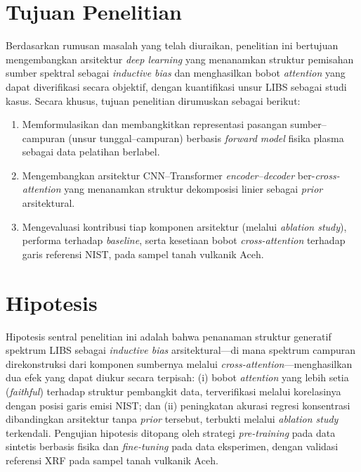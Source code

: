 \section{Tujuan Penelitian}
Berdasarkan rumusan masalah yang telah diuraikan, penelitian ini bertujuan mengembangkan arsitektur \textit{deep learning} yang menanamkan struktur pemisahan sumber spektral sebagai \textit{inductive bias} dan menghasilkan bobot \textit{attention} yang dapat diverifikasi secara objektif, dengan kuantifikasi unsur LIBS sebagai studi kasus. Secara khusus, tujuan penelitian dirumuskan sebagai berikut:
\begin{enumerate}
    \item Memformulasikan dan membangkitkan representasi pasangan sumber--campuran (unsur tunggal--campuran) berbasis \textit{forward model} fisika plasma sebagai data pelatihan berlabel.
    \item Mengembangkan arsitektur CNN--Transformer \textit{encoder--decoder} ber-\textit{cross-attention} yang menanamkan struktur dekomposisi linier sebagai \textit{prior} arsitektural.
    \item Mengevaluasi kontribusi tiap komponen arsitektur (melalui \textit{ablation study}), performa terhadap \textit{baseline}, serta kesetiaan bobot \textit{cross-attention} terhadap garis referensi NIST, pada sampel tanah vulkanik Aceh.
\end{enumerate}

\section{Hipotesis}
Hipotesis sentral penelitian ini adalah bahwa penanaman struktur generatif spektrum LIBS sebagai \textit{inductive bias} arsitektural---di mana spektrum campuran direkonstruksi dari komponen sumbernya melalui \textit{cross-attention}---menghasilkan dua efek yang dapat diukur secara terpisah: (i) bobot \textit{attention} yang lebih setia (\textit{faithful}) terhadap struktur pembangkit data, terverifikasi melalui korelasinya dengan posisi garis emisi NIST; dan (ii) peningkatan akurasi regresi konsentrasi dibandingkan arsitektur tanpa \textit{prior} tersebut, terbukti melalui \textit{ablation study} terkendali. Pengujian hipotesis ditopang oleh strategi \textit{pre-training} pada data sintetis berbasis fisika dan \textit{fine-tuning} pada data eksperimen, dengan validasi referensi XRF pada sampel tanah vulkanik Aceh.

